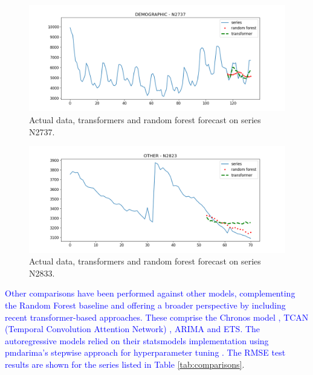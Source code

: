 \documentclass[algorithms,article,submit,pdftex,moreauthors]{Definitions/mdpi}
\begin{document}
\begin{figure}
	\centering
	\includegraphics[width=1.0\linewidth]{N2737.png}
	\caption{Actual data, transformers and random forest forecast on series N2737.}
	\label{fig:trbest}
\end{figure}
\begin{figure}
	\centering
	\includegraphics[width=1.0\linewidth]{N2823.png}
	\caption{Actual data, transformers and random forest forecast on series N2833.}
	\label{fig:trworse}
\end{figure}

\textcolor{blue}{Other comparisons have been performed against other models, complementing the Random Forest baseline and offering a broader perspective by including recent transformer-based approaches. These comprise the Chronos model \cite{chronos}, TCAN (Temporal Convolution Attention Network) \cite{tcan}, ARIMA and ETS. The autoregressive models relied on their statsmodels implementation \cite{SP10} using pmdarima's stepwise approach for hyperparameter tuning \cite{S17}. The RMSE test results are shown for the series listed in Table \ref{tab:comparisons}}.
\end{document}
